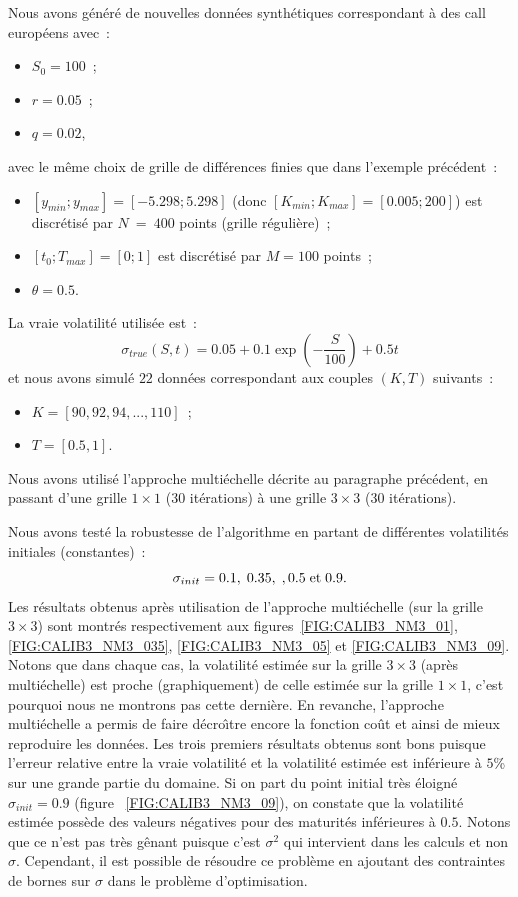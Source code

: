 Nous avons g\'en\'er\'e de nouvelles donn\'ees synth\'etiques 
correspondant \`a des call europ\'eens avec~:
\begin{itemize}
\item
$S_0 = 100$~;
\item
$r = 0.05$~;
\item
$q = 0.02$, 
\end{itemize}
avec le m\^eme choix de grille de diff\'erences finies que dans 
l'exemple pr\'ec\'edent~:
\begin{itemize}
\item
$\left[y_{min};y_{max}\right] = [-5.298;5.298]$ 
(donc $\left[K_{min};K_{max}\right] = [0.005;200]$) est 
discr\'etis\'e par $N~=~400$ points (grille r\'eguli\`ere)~;
\item
$\left[t_0;T_{max}\right] = [0;1]$ est discr\'etis\'e 
par $M = 100$ points~;
\item
$\theta = 0.5$.
\end{itemize}
La vraie volatilit\'e utilis\'ee est~:
$$
\sigma_{true}(S,t) = 0.05 
+ 0.1 \exp \left( -\frac{S}{100} \right) + 0.5 t
$$
et nous avons simul\'e $22$ donn\'ees correspondant aux couples 
$(K,T)$ suivants~:
\begin{itemize}
\item
$K = [90,92,94,...,110]$~;
\item
$T = [0.5,1]$.
\end{itemize}

Nous avons utilis\'e l'approche multi\'echelle d\'ecrite au 
paragraphe pr\'ec\'edent, en passant d'une grille $1 \times 1$ 
($30$ it\'erations) \`a une grille $3 \times 3$ 
($30$ it\'erations).

Nous avons test\'e la robustesse de l'algorithme en partant de 
diff\'erentes volatilit\'es initiales (constantes)~: 
$$
\sigma_{init} = 0.1,\;0.35,\;,0.5\;{\rm et}\;0.9.
$$
Les r\'esultats obtenus apr\`es utilisation de l'approche 
multi\'echelle (sur la grille $3 \times 3$) sont montr\'es 
respectivement aux figures~\ref{FIG:CALIB3_NM3_01}, 
\ref{FIG:CALIB3_NM3_035}, \ref{FIG:CALIB3_NM3_05} et 
\ref{FIG:CALIB3_NM3_09}. Notons que dans chaque cas, la 
volatilit\'e estim\'ee sur la grille $3 \times 3$ (apr\`es 
multi\'echelle) est proche (graphiquement) de celle 
estim\'ee sur la grille $1 \times 1$, c'est pourquoi nous ne 
montrons pas cette derni\`ere. En revanche, l'approche 
multi\'echelle a permis de faire d\'ecro\^{\i}tre encore la 
fonction co\^ut et ainsi de mieux reproduire les donn\'ees. 
Les trois premiers r\'esultats obtenus sont bons puisque 
l'erreur relative entre la vraie volatilit\'e et la 
volatilit\'e estim\'ee est inf\'erieure \`a $5$\% sur une 
grande partie du domaine. Si on part du point initial tr\`es 
\'eloign\'e $\sigma_{init} = 0.9$ (figure~ \ref{FIG:CALIB3_NM3_09}), 
on constate que la volatilit\'e estim\'ee poss\`ede des valeurs 
n\'egatives pour des maturit\'es inf\'erieures \`a $0.5$. Notons que 
ce n'est pas tr\`es g\^enant puisque c'est $\sigma^2$ qui intervient 
dans les calculs et non $\sigma$. Cependant, il est possible de 
r\'esoudre ce probl\`eme en ajoutant des contraintes de bornes sur 
$\sigma$ dans le probl\`eme d'optimisation.

